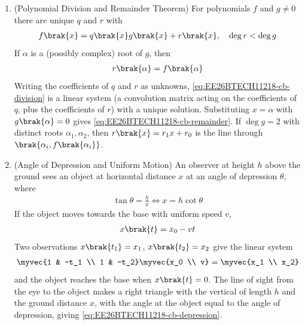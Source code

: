\begin{enumerate}[label=\thesubsection.\arabic*, ref=\thesubsection.\theenumi,itemsep=1.5em]
\item (Polynomial Division and Remainder Theorem) For polynomials $f$ and $g\ne0$ there are unique $q$ and $r$ with
\begin{align}
f\brak{x} = q\brak{x}g\brak{x} + r\brak{x}, \quad \deg r < \deg g
\label{eq:EE26BTECH11218-cb-division}
\end{align}
If $\alpha$ is a (possibly complex) root of $g$, then
\begin{align}
r\brak{\alpha} = f\brak{\alpha}
\label{eq:EE26BTECH11218-cb-remainder}
\end{align}
\solution Writing the coefficients of $q$ and $r$ as unknowns, \eqref{eq:EE26BTECH11218-cb-division} is a linear system (a convolution matrix acting on the coefficients of $q$, plus the coefficients of $r$) with a unique solution. Substituting $x=\alpha$ with $g\brak{\alpha}=0$ gives \eqref{eq:EE26BTECH11218-cb-remainder}. If $\deg g = 2$ with distinct roots $\alpha_1,\alpha_2$, then $r\brak{x}=r_1x+r_0$ is the line through $\brak{\alpha_i, f\brak{\alpha_i}}$.

\item (Angle of Depression and Uniform Motion) An observer at height $h$ above the ground sees an object at horizontal distance $x$ at an angle of depression $\theta$, where
\begin{align}
\tan\theta = \frac{h}{x} \iff x = h\cot\theta
\label{eq:EE26BTECH11218-cb-depression}
\end{align}
If the object moves towards the base with uniform speed $v$,
\begin{align}
x\brak{t} = x_0 - vt
\label{eq:EE26BTECH11218-cb-uniform}
\end{align}
Two observations $x\brak{t_1}=x_1$, $x\brak{t_2}=x_2$ give the linear system
\begin{align}
\myvec{1 & -t_1 \\ 1 & -t_2}\myvec{x_0 \\ v} = \myvec{x_1 \\ x_2}
\label{eq:EE26BTECH11218-cb-uniform-sys}
\end{align}
and the object reaches the base when $x\brak{t}=0$.
\solution The line of sight from the eye to the object makes a right triangle with the vertical of length $h$ and the ground distance $x$, with the angle at the object equal to the angle of depression, giving \eqref{eq:EE26BTECH11218-cb-depression}.
\end{enumerate}
